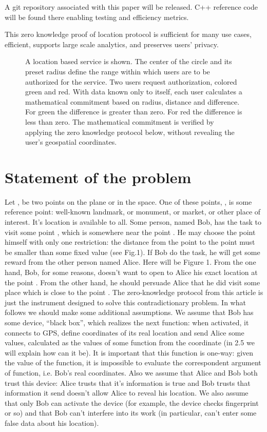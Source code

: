 \documentclass{article}
\begin{document}
A git repository associated with this paper will be released. C++ reference code will be found there enabling testing and efficiency metrics. 

This zero knowledge proof of location protocol is sufficient for many use cases, efficient, supports large scale analytics, and preserves users' privacy.

\begin{figure}
  \centering
  \def\svgwidth{\columnwidth}
  
\caption{A location based service is shown.
The center of the circle and its preset radius define the range within which users are to be authorized for the service.
Two users request authorization, colored green and red.
With data known only to itself, each user calculates a mathematical commitment based on radius, distance and difference.
For green the difference is greater than zero.
For red the difference is less than zero.
The mathematical commitment is verified by applying the zero knowledge protocol below, without revealing the user's geospatial coordinates.}
\label{fig-rangeproof}
\end{figure}

\section{Statement of the problem}

Let     ,      be two points on the plane or in the space.
One of these points,     , is some reference point: well-known landmark, or monument, or market, or other place of interest.
It’s location is available to all.
Some person, named Bob, has the task to visit some point     , which is somewhere near the point     .
He may choose the point      himself with only one restriction: the distance from the point      
to the point      must be smaller than some fixed value (see Fig.1).
If Bob do the task, he will get some reward from the other person named Alice.
Here will be Figure 1.
From the one hand, Bob, for some reasons, doesn’t want to open to Alice his exact location at the point     .
From the other hand, he should persuade Alice that he did visit some place which is close to the point     .
The zero-knowledge protocol from this article is just the instrument designed to solve this contradictionary problem.
In what follows we should make some additional assumptions.
We assume that Bob has some device, “black box”, which realizes the next function: when activated, it connects to GPS,
define coordinates of its real location and send Alice some values, calculated as the values of some function from the coordinate (in 2.5 we will explain how can it be).
It is important that this function is one-way: given the value of the function, it is impossible to evaluate the correspondent argument of function, i.e. Bob’s real coordinates.
Also we assume that Alice and Bob both trust this device: Alice trusts that it’s information is true and Bob trusts that information it send doesn’t allow Alice to reveal his location.
We also assume that only Bob can activate the device (for example, the device checks fingerprint or so) and that Bob can’t interfere into its work (in particular,
can’t enter some false data about his location).
\end{document}

